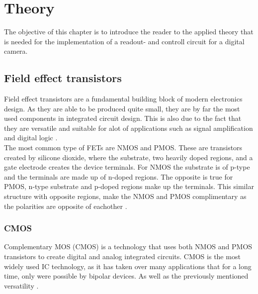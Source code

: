 \newpage
\section{Theory}
\label{Theroy}
The objective of this chapter is to introduce the reader to the applied theory that is needed for the implementation of a readout- and controll circuit for a digital camera.

\subsection{Field effect transistors}
\label{FET}
Field effect transistors are a fundamental building block of modern electronics design. 
As they are able to be produced quite small, they are by far the most used components in integrated circuit design. 
This is also due to the fact that they are versatile and suitable for alot of applications such as signal amplification and digital logic \cite{sedra_smith_2016}.\\
The most common type of FETs are NMOS and PMOS. 
These are transistors created by silicone dioxide, where the substrate, two heavily doped regions, and a gate electrode creates the device terminals. 
For NMOS the substrate is of p-type and the terminals are made up of n-doped regions. 
The opposite is true for PMOS, n-type substrate and p-doped regions make up the terminals. 
This similar structure with opposite regions, make the NMOS and PMOS complimentary as the polarities are opposite of eachother \cite{sedra_smith_2016}.


\subsubsection{CMOS}
\label{CMOS}
Complementary MOS (CMOS) is a technology that uses both NMOS and PMOS transistors to create digital and analog integrated circuits. 
CMOS is the most widely used IC technology, as it has taken over many applications that for a long time, only were possible by bipolar devices. As well as the previously mentioned versatility \cite{sedra_smith_2016}. 

